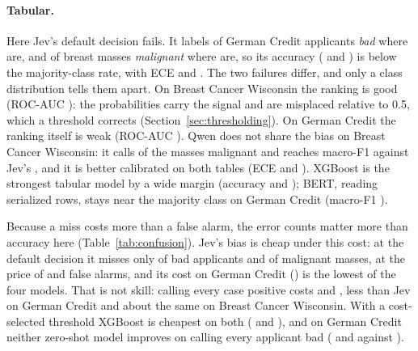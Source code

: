 \paragraph{Tabular.}
Here Jev's default decision fails. It labels \PredictedPositiveJevGerman{} of German Credit
applicants \emph{bad} where \TruePositiveGerman{} are, and \PredictedPositiveJevWdbc{} of breast
masses \emph{malignant} where \TruePositiveWdbc{} are, so its accuracy (\AccuracyJevGerman{} and
\AccuracyJevWdbc) is below the majority-class rate, with ECE \EceJevGerman{} and \EceJevWdbc.
The two failures differ, and only a class distribution tells them apart. On Breast Cancer
Wisconsin the ranking is good (ROC-AUC \RocAucJevWdbc): the probabilities carry the signal and
are misplaced relative to 0.5, which a threshold corrects (Section~\ref{sec:thresholding}). On
German Credit the ranking itself is weak (ROC-AUC \RocAucJevGerman). Qwen does not share the bias
on Breast Cancer Wisconsin: it calls \PredictedPositiveQwenWdbc{} of the masses malignant and
reaches macro-F1 \MacroFOneQwenWdbc{} against Jev's \MacroFOneJevWdbc, and it is better
calibrated on both tables (ECE \EceQwenGerman{} and \EceQwenWdbc). XGBoost is the strongest
tabular model by a wide margin (accuracy \AccuracyXgbGerman{} and \AccuracyXgbWdbc); BERT,
reading serialized rows, stays near the majority class on German Credit (macro-F1
\MacroFOneBertGerman).

Because a miss costs more than a false alarm, the error counts matter more than accuracy here
(Table~\ref{tab:confusion}). Jev's bias is cheap under this cost: at the default decision it
misses only \ConfFnDefaultJevGerman{} of \ConfPositivesGerman{} bad applicants and
\ConfFnDefaultJevWdbc{} of \ConfPositivesWdbc{} malignant masses, at the price of
\ConfFpDefaultJevGerman{} and \ConfFpDefaultJevWdbc{} false alarms, and its cost on German
Credit (\ConfCostDefaultJevGerman) is the lowest of the four models. That is not skill: calling
every case positive costs \ConfCostFlagAllGerman{} and \ConfCostFlagAllWdbc, less than Jev on
German Credit and about the same on Breast Cancer Wisconsin. With a cost-selected threshold
XGBoost is cheapest on both (\ConfCostValidationXgbGerman{} and \ConfCostValidationXgbWdbc), and
on German Credit neither zero-shot model improves on calling every applicant bad
(\ConfCostValidationJevGerman{} and \ConfCostValidationQwenGerman{} against
\ConfCostFlagAllGerman).

